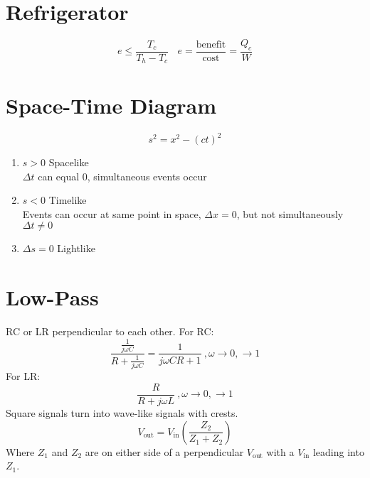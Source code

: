 \documentclass[10pt,letter]{article}
\begin{document}
\section{Refrigerator} %
\label{sec:refrigerator}
\begin{equation}
    e \leq \frac{T_c}{T_h - T_c} ~~~~ e = \frac{\textrm{benefit}}{\textrm{cost}} = \frac{Q_c}{W}
\end{equation}

\section{Space-Time Diagram} %
\label{sec:space_time_diagram}
\begin{equation}
    s^2 = x^2 - (ct)^2
\end{equation}
\begin{enumerate}
    \item $s>0$ Spacelike\\
    $\Delta t$ can equal 0, simultaneous events occur
    \item $s<0$ Timelike\\
    Events can occur at same point in space, $ \Delta x = 0$, but not simultaneously $ \Delta t \neq 0$
    \item $\Delta s = 0$ Lightlike
\end{enumerate}

\section{Low-Pass} %
\label{sec:low_pass}
RC or LR perpendicular to each other. For RC:
\begin{equation}
   \frac{ \frac{1}{j \omega C} }{R + \frac{1}{j\omega C}} = \frac{1}{j \omega CR + 1}~, \omega \rightarrow 0, \rightarrow 1
\end{equation}
For LR:
\begin{equation}
    \frac{R}{R + j \omega L}~, \omega \rightarrow 0,\rightarrow 1
\end{equation}
Square signals turn into wave-like signals with crests. 
\begin{equation}
    V_{\textrm{out}} = V_{\textrm{in}} \left( \frac{Z_2}{Z_1 + Z_2} \right) 
\end{equation}
Where $Z_1$ and $Z_2$ are on either side of a perpendicular $V_{\textrm{out}}$ with a $V_{\textrm{in}}$ leading into $Z_1$.
\end{document}
